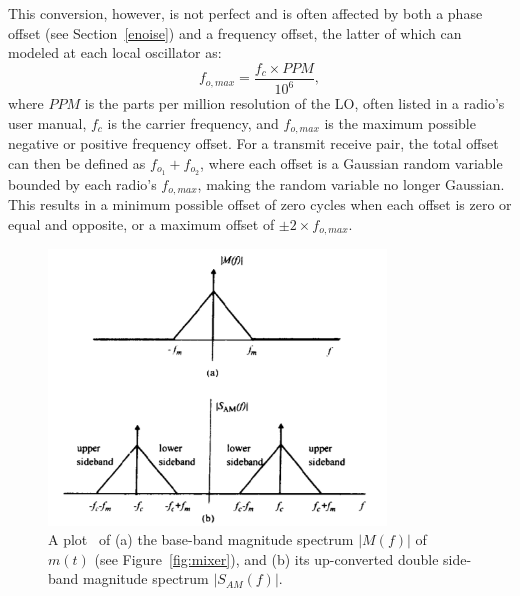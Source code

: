 This conversion, however, is not perfect and is often affected by both a phase offset (see Section~\ref{enoise}) and a frequency offset, the latter of which can modeled at each local oscillator as:
\begin{equation}
\label{eq:fo}
f_{o,max} = \frac{f_c \times PPM}{10^6},
\end{equation}
where $PPM$ is the parts per million resolution of the LO, often listed in a radio's user manual, $f_c$ is the carrier frequency, and $f_{o,max}$ is the maximum possible negative or positive frequency offset. For a transmit receive pair, the total offset can then be defined as $f_{o_1} + f_{o_2}$, where each offset is a Gaussian random variable bounded by each radio's $f_{o,max}$, making the random variable no longer Gaussian. This results in a minimum possible offset of zero cycles when each offset is zero or equal and opposite, or a maximum offset of $\pm 2 \times f_{o,max}$.


\begin{figure}[ht!]
	\centering	\includegraphics[width=0.8\textwidth,keepaspectratio]{figs/upconv.png}
    \caption{A plot~\cite{rappaport1996wireless} of (a) the base-band magnitude spectrum $|M(f)|$ of $m(t)$ (see Figure~\ref{fig:mixer}), and (b) its up-converted double side-band magnitude spectrum $|S_{AM}(f)|$.}
\label{fig:upconv}      
\end{figure}
\FloatBarrier

